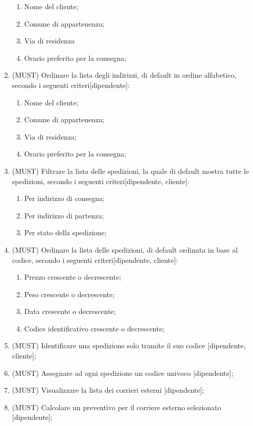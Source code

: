 \begin{enumerate}
    \begin{enumerate}
      \item{Nome del cliente};
      \item{Comune di appartenenza};
      \item{Via di residenza}
      \item{Orario preferito per la consegna};
    \end{enumerate}
  \item{(MUST)} Ordinare la lista degli indirizzi, di default in ordine alfabetico, secondo i seguenti criteri[dipendente]:
    \begin{enumerate}
      \item{Nome del cliente};
      \item{Comune di appartenenza};
      \item{Via di residenza};
      \item{Orario preferito per la consegna};
    \end{enumerate}
  \item{(MUST)} Filtrare la lista delle spedizioni, la quale di default mostra tutte le spedizioni, secondo i seguenti criteri[dipendente, cliente]:
    \begin{enumerate}
      \item{Per indirizzo di consegna};
      \item{Per indirizzo di partenza};
      \item{Per stato della spedizione};
    \end{enumerate}
  \item{(MUST)} Ordinare la lista delle spedizioni, di default ordinata in base al codice, secondo i seguenti criteri[dipendente, cliente]:
    \begin{enumerate}
      \item{Prezzo crescente o decrescente};
      \item{Peso crescente o decrescente};
      \item{Data crescente o decrescente};
      \item{Codice identificativo crescente o decrescente};
    \end{enumerate}
  \item{(MUST)} Identificare una spedizione solo tramite il suo codice [dipendente, cliente];
  \item{(MUST)} Assegnare ad ogni spedizione un codice univoco [dipendente];
  \item{(MUST)} Visualizzare la lista dei corrieri esterni [dipendente];
  \item{(MUST)} Calcolare un preventivo per il corriere esterno selezionato [dipendente];
\end{enumerate}
